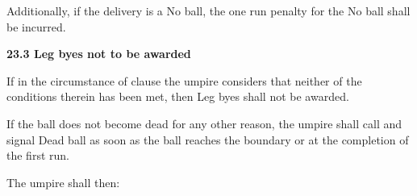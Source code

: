 \documentclass[12pt]{article}
\begin{document}
\vspace{\baselineskip}
\begin{adjustwidth}{0.5in}{0.0in}
{\fontsize{9pt}{10.8pt}\selectfont Additionally, if the delivery is a No ball, the one run penalty for the No ball shall be incurred.\par}\par

\end{adjustwidth}


\vspace{\baselineskip}
{\fontsize{11pt}{13.2pt}\selectfont \textbf{23.3 \tabto{0.47in} Leg byes not to be awarded}\par}\par


\vspace{\baselineskip}
\begin{adjustwidth}{0.0in}{0.08in}
{\fontsize{9pt}{10.8pt}\selectfont If in the circumstance of clause the umpire considers that neither of the conditions therein has been met, then Leg byes shall not be awarded.\par}\par

\end{adjustwidth}


\vspace{\baselineskip}
\begin{adjustwidth}{0.0in}{0.11in}
{\fontsize{9pt}{10.8pt}\selectfont If the ball does not become dead for any other reason, the umpire shall call and signal Dead ball as soon as the ball reaches the boundary or at the completion of the first run.\par}\par

\end{adjustwidth}


\vspace{\baselineskip}
{\fontsize{9pt}{10.8pt}\selectfont The umpire shall then:\par}\par
\end{document}
